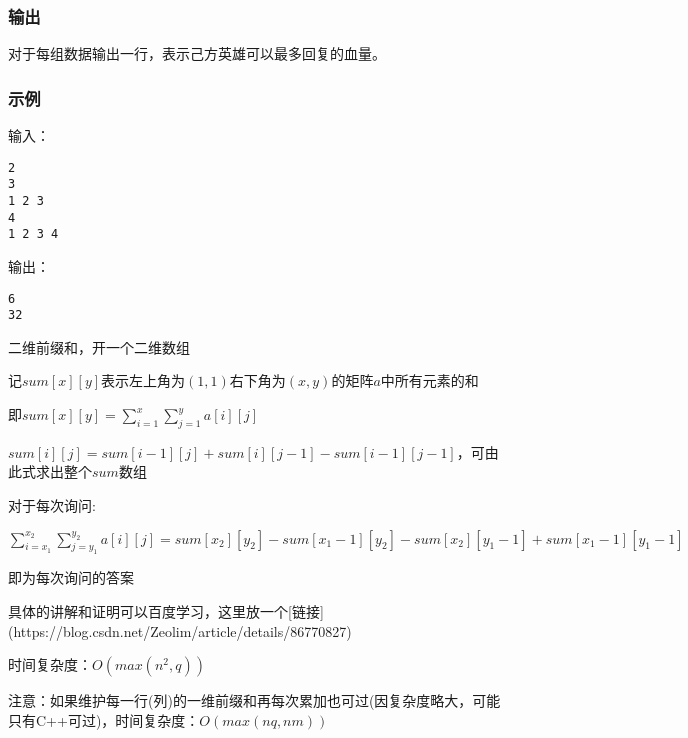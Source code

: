 \subsubsection{输出}
对于每组数据输出一行，表示己方英雄可以最多回复的血量。

\subsubsection{示例}
输入：
\begin{lstlisting}
2
3
1 2 3
4
1 2 3 4
\end{lstlisting}

输出：
\begin{lstlisting}
6
32
\end{lstlisting}

二维前缀和，开一个二维数组

记$sum[x][y]$表示左上角为$(1, 1)$右下角为$(x, y)$的矩阵$a$中所有元素的和

即$sum[x][y] = \sum\limits_{i = 1}^{x}\sum\limits_{j = 1}^{y}{a[i][j]}$

$sum[i][j] = sum[i - 1][j] + sum[i][j - 1] - sum[i - 1][j - 1]$，可由此式求出整个$sum$数组

对于每次询问:

$\sum\limits_{i = x_1}^{x_2}\sum\limits_{j = y_1}^{y_2}{a[i][j]} = sum[x_2][y_2] - sum[x_1 - 1][y_2] - sum[x_2][y_1 - 1] + sum[x_1 - 1][y_1 - 1]$

即为每次询问的答案

具体的讲解和证明可以百度学习，这里放一个[链接](https://blog.csdn.net/Zeolim/article/details/86770827)

时间复杂度：$O(max(n^2, q))$

注意：如果维护每一行(列)的一维前缀和再每次累加也可过(因复杂度略大，可能只有C++可过)，时间复杂度：$O(max(nq, nm))$

